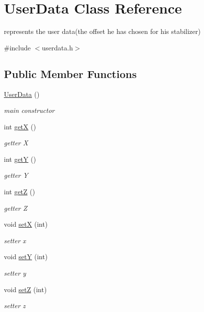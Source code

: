 \hypertarget{class_user_data}{\section{User\-Data Class Reference}
\label{class_user_data}
}


represents the user data(the offset he has chosen for his stabilizer)  




{\ttfamily \#include $<$userdata.\-h$>$}

\subsection*{Public Member Functions}
\begin{DoxyCompactItemize}
\item 
\hypertarget{class_user_data_a1d4f7b61ec5dd67bbd4e03efd4f85ce8}{\hyperlink{class_user_data_a1d4f7b61ec5dd67bbd4e03efd4f85ce8}{User\-Data} ()}\label{class_user_data_a1d4f7b61ec5dd67bbd4e03efd4f85ce8}

\begin{DoxyCompactList}\small\item\em main constructor \end{DoxyCompactList}\item 
int \hyperlink{class_user_data_aab9e0256d899b0ebd42f6ce5ab943b3e}{get\-X} ()
\begin{DoxyCompactList}\small\item\em getter X \end{DoxyCompactList}\item 
int \hyperlink{class_user_data_a526578c6937e9d36eb375621418ddfbc}{get\-Y} ()
\begin{DoxyCompactList}\small\item\em getter Y \end{DoxyCompactList}\item 
int \hyperlink{class_user_data_af1c783c40df183b19d1c1bf6779d9232}{get\-Z} ()
\begin{DoxyCompactList}\small\item\em getter Z \end{DoxyCompactList}\item 
void \hyperlink{class_user_data_ae8f570275ee8cc51fb86657a77730fab}{set\-X} (int)
\begin{DoxyCompactList}\small\item\em setter x \end{DoxyCompactList}\item 
void \hyperlink{class_user_data_a263a40e7bf596509b02954c0bb017f5f}{set\-Y} (int)
\begin{DoxyCompactList}\small\item\em setter y \end{DoxyCompactList}\item 
void \hyperlink{class_user_data_a73d14105631aced4993ce7d3ec5bf3e5}{set\-Z} (int)
\begin{DoxyCompactList}\small\item\em setter z \end{DoxyCompactList}\end{DoxyCompactItemize}
